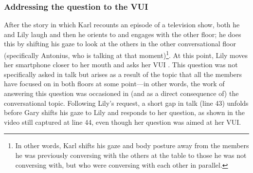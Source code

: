\crpagebreak\subsubsection{Addressing the question to the VUI}\label{sec:empirical cafe findings answering address}
\begin{revisedsubmission}
After the story in which Karl recounts an episode of a television show, both he and Lily laugh and then he orients to and engages with the other floor; he does this by shifting his gaze to look at the others in the other conversational floor (specifically Antonius, who is talking at that moment)\footnote{In other words, Karl shifts his gaze and body posture away from the members he was previously conversing with the others at the table to those he was not conversing with, but who were conversing with each other in parallel.}.
At this point, Lily moves her smartphone closer to her mouth and asks her \ac{VUI} .
This question was not specifically asked in talk but arises as a result of the topic that all the members have focused on in both floors at some point---in other words, the work of answering this question was occasioned in (and as a direct consequence of) the conversational topic.
Following Lily's request, a short gap in talk (line 43) unfolds before Gary shifts his gaze to Lily and responds to her question, as shown in the video still captured at line 44, even though her question was aimed at her \ac{VUI}.


\end{revisedsubmission}
